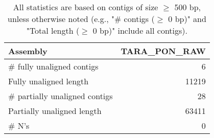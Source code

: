 \documentclass[12pt,a4paper]{article}
\begin{document}
\begin{table}[ht]
\begin{center}
\caption{All statistics are based on contigs of size $\geq$ 500 bp, unless otherwise noted (e.g., "\# contigs ($\geq$ 0 bp)" and "Total length ($\geq$ 0 bp)" include all contigs).}
\begin{tabular}{|l*{1}{|r}|}
\hline
Assembly & TARA\_PON\_RAW \\ \hline
\# fully unaligned contigs & 6 \\ \hline
Fully unaligned length & 11219 \\ \hline
\# partially unaligned contigs & 28 \\ \hline
Partially unaligned length & 63411 \\ \hline
\# N's & 0 \\ \hline
\end{tabular}
\end{center}
\end{table}
\end{document}

